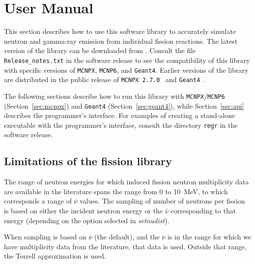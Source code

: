 %
%
%
%
%


\section{User Manual}

This section describes how to use this software library to accurately simulate neutron and gamma-ray emission from individual fission reactions.
The latest version of the library can be downloaded from \httpnuclear. Consult the file \texttt{Release\_notes.txt} in the software release to see the compatibility of this library with specific versions of {\tt MCNPX}, {\tt MCNP6}, and {\tt Geant4}.  Earlier versions of the library are distributed in the public release of {\tt MCNPX 2.7.0}~\cite{MCNPX} and {\tt Geant4}~\cite{Geant1,Geant2}.

The following sections describe how to run this library with {\tt MCNPX}/{\tt MCNP6} (Section~\ref{sec:mcnpx}) and {\tt Geant4} (Section~\ref{sec:geant4}), while Section~\ref{sec:api} describes the programmer's interface. 
For examples of creating a stand-alone executable with the programmer's interface, consult the directory \texttt{regr} in the software release.

\subsection{Limitations of the fission library~\label{Limitations of the fission library}}

The range of neutron energies for which induced fission neutron 
multiplicity data are available in the literature spans the range 
from 0 to 10~MeV, to which corresponds a range of $\bar{\nu}$ 
values.  The sampling of number of neutrons per fission is based on 
either the incident neutron energy or the $\bar{\nu}$ corresponding to 
that energy (depending on the option selected in \textit{setnudist}). 

When sampling is based on $\bar{\nu}$ (the default), 
and the $\bar{\nu}$ is in the range for which we have multiplicity 
data from the literature, that data is used. Outside that 
range, the Terrell approximation is used.

